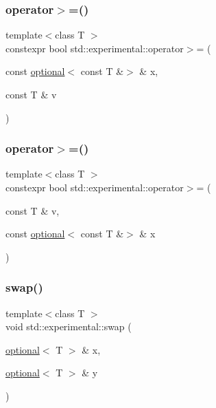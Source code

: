 \subsubsection{\texorpdfstring{operator$>$=()}{operator>=()}\hspace{0.1cm}{\footnotesize\ttfamily [8/9]}}
{\footnotesize\ttfamily template$<$class T $>$ \\
constexpr bool std\+::experimental\+::operator$>$= (\begin{DoxyParamCaption}\item[{const \mbox{\hyperlink{classstd_1_1experimental_1_1optional}{optional}}$<$ const T \&$>$ \&}]{x,  }\item[{const T \&}]{v }\end{DoxyParamCaption})}

\mbox{\label{namespacestd_1_1experimental_a943314dada174c65a0ac853cbdc89989}} 
\subsubsection{\texorpdfstring{operator$>$=()}{operator>=()}\hspace{0.1cm}{\footnotesize\ttfamily [9/9]}}
{\footnotesize\ttfamily template$<$class T $>$ \\
constexpr bool std\+::experimental\+::operator$>$= (\begin{DoxyParamCaption}\item[{const T \&}]{v,  }\item[{const \mbox{\hyperlink{classstd_1_1experimental_1_1optional}{optional}}$<$ const T \&$>$ \&}]{x }\end{DoxyParamCaption})}

\mbox{\label{namespacestd_1_1experimental_acdfba2d2e9c79f689a34c9cea5c5682d}} 
\subsubsection{\texorpdfstring{swap()}{swap()}}
{\footnotesize\ttfamily template$<$class T $>$ \\
void std\+::experimental\+::swap (\begin{DoxyParamCaption}\item[{\mbox{\hyperlink{classstd_1_1experimental_1_1optional}{optional}}$<$ T $>$ \&}]{x,  }\item[{\mbox{\hyperlink{classstd_1_1experimental_1_1optional}{optional}}$<$ T $>$ \&}]{y }\end{DoxyParamCaption})\hspace{0.3cm}{\ttfamily [noexcept]}}



